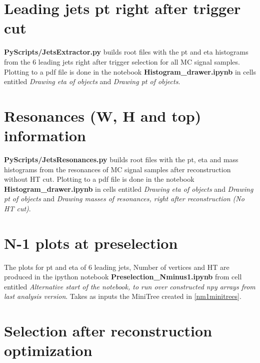 \documentclass[11pt,a4paper]{article}
\begin{document}
\section{Leading jets pt right after trigger cut}

\textbf{PyScripts/JetsExtractor.py} builds root files with the pt and eta histograms from the 6 leading jets right after trigger selection for all MC signal samples. Plotting to a pdf file is done in the notebook \textbf{Histogram\_drawer.ipynb} in cells entitled \textit{Drawing eta of objects} and \textit{Drawing pt of objects}. 

\section{Resonances (W, H and top) information}

\textbf{PyScripts/JetsResonances.py} builds root files with the pt, eta and mass histograms from the resonances of MC signal samples after reconstruction without HT cut. Plotting to a pdf file is done in the notebook \textbf{Histogram\_drawer.ipynb} in cells entitled \textit{Drawing eta of objects} and \textit{Drawing pt of objects} and \textit{Drawing masses of resonances, right after reconstruction (No HT cut)}. 

\section{N-1 plots at preselection}

The plots for pt and eta of 6 leading jets, Number of vertices and HT are produced in the ipython notebook \textbf{Preselection\_Nminus1.ipynb} from cell entitled \textit{Alternative start of the notebook, to run over constructed npy arrays from last analysis version}. Takes as inputs the MiniTree created in \ref{nm1minitrees}.

\section{Selection after reconstruction optimization}
\end{document}
